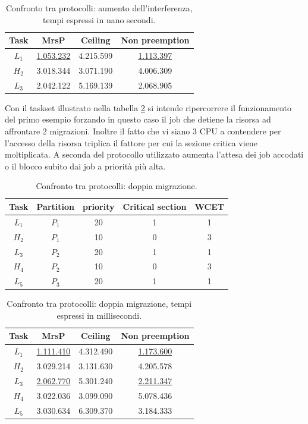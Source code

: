 {\begin{table}
  \centering
  \begin{tabular}{cccc}
  \hline\hline
    Task & MrsP & Ceiling & Non preemption \\ \hline
    $L_1$ & \underline{1.053.232} & 4.215.599 & \underline{1.113.397} \\
    $H_2$ & 3.018.344 & 3.071.190 & 4.006.309 \\
    $L_3$ & 2.042.122 & 5.169.139 & 2.068.905 \\
    \hline
    \end{tabular}
    \caption{Confronto tra protocolli: aumento dell'interferenza, tempi espressi in nano secondi.}
  \label{tab:test_protocols_Taskset3_ris}
  \end{table}

\noindent Con il taskset illustrato nella tabella \ref{tab:test_protocols_Taskset4} si intende ripercorrere il funzionamento del primo esempio forzando in questo caso il job che detiene la risorsa ad affrontare 2 migrazioni. Inoltre il fatto che vi siano 3 CPU a contendere per l'accesso della risorsa triplica il fattore per cui la sezione critica viene moltiplicata. A seconda del protocollo utilizzato aumenta l'attesa dei job accodati o il blocco subito dai job a priorità più alta.\\

\begin{table}
  \centering
  \begin{tabular}{ccccc}
  \hline\hline
    Task & Partition     & priority & Critical section & WCET  \\ \hline
    $L_1$ & $P_1$  & 20 & 1 & 1 \\
    $H_2$ & $P_1$  & 10 & 0 & 3 \\
    $L_3$ & $P_2$  & 20 & 1 & 1 \\
    $H_4$ & $P_2$  & 10 & 0 & 3 \\
    $L_5$ & $P_3$  & 20 & 1 & 1 \\
    \hline
    \end{tabular}
    \caption{Confronto tra protocolli: doppia migrazione.}
  \label{tab:test_protocols_Taskset4}
  \end{table}

  \begin{table}
  \centering
  \begin{tabular}{cccc}
  \hline\hline
    Task & MrsP & Ceiling & Non preemption \\ \hline
    $L_1$ & \underline{1.111.410} & 4.312.490 & \underline{1.173.600} \\
    $H_2$ & 3.029.214 & 3.131.630 & 4.205.578 \\
    $L_3$ & \underline{2.062.770} & 5.301.240 & \underline{2.211.347} \\
    $H_4$ & 3.022.036 & 3.099.090 & 5.078.436 \\
    $L_5$ & 3.030.634 & 6.309.370 & 3.184.333 \\
    \hline
    \end{tabular}
    \caption{Confronto tra protocolli: doppia migrazione, tempi espressi in millisecondi.}
  \label{tab:test_protocols_Taskset4_ris}
  \end{table}

}
